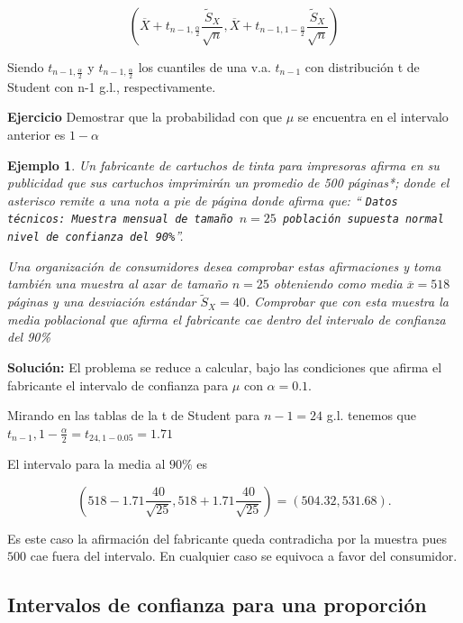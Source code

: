 \documentclass[12pt]{report}
\newtheorem{example}[definition]{Ejemplo}
\begin{document}
$$\left( \overline{X}+t_{n-1,\frac{\alpha}{2}} \frac{\tilde{S}_{X}}{\sqrt{n}},
\overline{X}+t_{n-1,1-\frac{\alpha}{2}}\frac{\tilde{S}_{X}}{\sqrt{n}} \right)$$

Siendo $t_{n-1,\frac{\alpha}{2}}$ y $t_{n-1,\frac{\alpha}{2}}$ los cuantiles de una v.a.
$t_{n-1}$ con distribuci\'on t de Student con n-1 g.l., respectivamente.

              \textbf{Ejercicio}
    Demostrar que la probabilidad con
    que $\mu$ se encuentra en el intervalo anterior es $1-\alpha$





\begin{example}
Un fabricante de cartuchos de tinta para impresoras afirma en su publicidad  que sus
cartuchos  imprimir\'an  un promedio de 500 p\'aginas*; donde el asterisco remite a una nota a
pie de p\'agina donde afirma que: `` \texttt{Datos t\'ecnicos: Muestra mensual de tama\~{n}o $n=25$
poblaci\'on supuesta normal
 nivel de confianza del 90\%}''.

  Una organizaci\'on de consumidores desea
comprobar estas afirmaciones y toma tambi\'en una muestra al azar de tama\~{n}o $n=25$ obteniendo
como media $\overline{x}=518$ p\'aginas y una desviaci\'on est\'andar $\tilde{S}_{X}=40$.
Comprobar que con esta muestra la media poblacional que afirma el fabricante cae dentro del
intervalo de confianza del 90\%
\end{example}

\textbf{Soluci\'on:} El problema se reduce a  calcular, bajo las condiciones que afirma el
fabricante el intervalo de confianza para $\mu$ con $\alpha=0.1$.

Mirando en las tablas de la t de Student para $n-1=24$ g.l. tenemos que
$t_{n-1},1-\frac{\alpha}{2}=t_{24,1-0.05}=1.71$


El intervalo para la media al $90\%$ es

$$\left(518-1.71\frac{40}{\sqrt{25}}   , 518+1.71\frac{40}{\sqrt{25}}\right)=
\left(504.32,531.68\right).$$

Es este caso la afirmaci\'on del fabricante  queda contradicha por la muestra pues $500$ cae
fuera del intervalo. En cualquier caso se equivoca a favor del consumidor.


\subsection{Intervalos de confianza para una proporci\'on}
\end{document}
